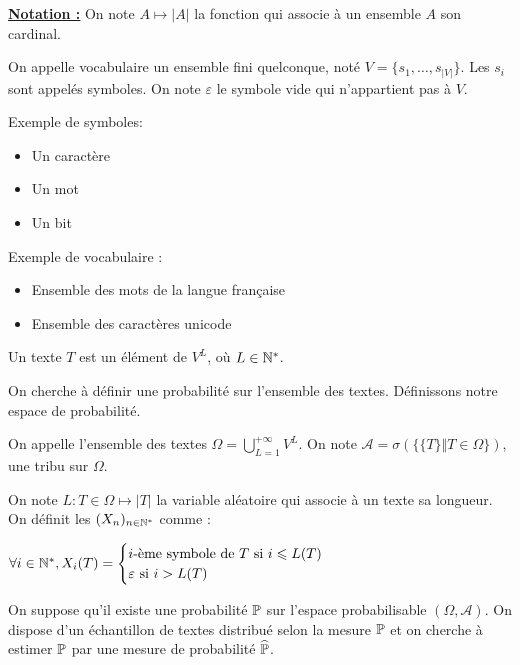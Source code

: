\underline{\textbf{Notation :}} On note $A \mapsto \vert A \vert$ la fonction qui associe à un ensemble $A$ son cardinal.

\begin{definition}
  On appelle vocabulaire un ensemble fini quelconque, noté $V = \{ s_1, \ldots, s_{\vert V \vert} \}$. Les $s_i$ sont appelés symboles.
  On note $\varepsilon$ le symbole vide qui n'appartient pas à $V$.
\end{definition}

Exemple de symboles:
\begin{itemize}
\item Un caractère
\item Un mot
\item Un bit
\end{itemize}

Exemple de vocabulaire :
  \begin{itemize}
      \item Ensemble des mots de la langue française
      \item Ensemble des caractères unicode
  \end{itemize}

\begin{definition}
Un texte $T$ est un élément de $V^L$, où $L \in \N^*$.
\end{definition}

On cherche à définir une probabilité sur l'ensemble des textes. Définissons notre espace de probabilité.

\begin{definition}
On appelle l'ensemble des textes $\Omega = \bigcup_{L=1}^{+\infty} V^L$.
On note $\mathcal{A} = \sigma\left(\{\{T\} \Vert T \in \Omega \} \right)$, une tribu sur $\Omega$.
\end{definition}

On note $L : T \in \Omega \mapsto \vert T \vert$ la variable aléatoire qui associe à un texte sa longueur.
On définit les $(X_n)_{n \in \N^*}$ comme :

$\forall i \in \N^*, X_i(T) = \begin{cases}
  i\text{-ème symbole de } T \text{ si } i \leq L(T) \\
  \varepsilon \text{ si } i > L(T)
\end{cases}$

\vspace{0.4cm}

On suppose qu'il existe une probabilité $\P$ sur l'espace probabilisable $(\Omega, \mathcal{A})$.
On dispose d'un échantillon de textes distribué selon la mesure $\P$ et on cherche à estimer $\P$ par une mesure de probabilité $\widehat{\P}$.

